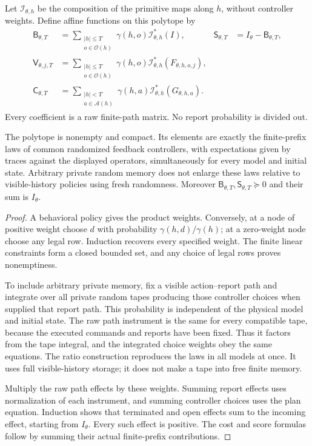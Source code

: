 Let $\mathcal I_{\theta,h}$ be the composition of the primitive maps along $h$, without controller weights. Define affine functions on this polytope by
\begin{align}
 \mathsf B_{\theta,T}&=\sum_{\substack{|h|\le T\\o\in\mathcal O(h)}}
       \gamma(h,o)\mathcal I_{\theta,h}^*(I),&
 \mathsf S_{\theta,T}&=I_\theta-\mathsf B_{\theta,T},\label{eq:syn-mass}\\
 \mathsf V_{\theta,j,T}&=\sum_{\substack{|h|\le T\\o\in\mathcal O(h)}}
       \gamma(h,o)\mathcal I_{\theta,h}^*(F_{\theta,h,o,j}),\label{eq:syn-value}\\
 \mathsf C_{\theta,T}&=\sum_{\substack{|h|<T\\a\in\mathcal A(h)}}
       \gamma(h,a)\mathcal I_{\theta,h}^*(G_{\theta,h,a}).\label{eq:syn-cost}
\end{align}
Every coefficient is a raw finite-path matrix. No report probability is divided out.

\begin{lemma}\label{lem:common-plan}
The polytope is nonempty and compact. Its elements are exactly the finite-prefix laws of common randomized feedback controllers, with expectations given by traces against the displayed operators, simultaneously for every model and initial state. Arbitrary private random memory does not enlarge these laws relative to visible-history policies using fresh randomness. Moreover $\mathsf B_{\theta,T},\mathsf S_{\theta,T}\succeq0$ and their sum is $I_\theta$.
\end{lemma}
\begin{proof}
A behavioral policy gives the product weights. Conversely, at a node of positive weight choose $d$ with probability $\gamma(h,d)/\gamma(h)$; at a zero-weight node choose any legal row. Induction recovers every specified weight. The finite linear constraints form a closed bounded set, and any choice of legal rows proves nonemptiness.

To include arbitrary private memory, fix a visible action--report path and integrate over all private random tapes producing those controller choices when supplied that report path. This probability is independent of the physical model and initial state. The raw path instrument is the same for every compatible tape, because the executed commands and reports have been fixed. Thus it factors from the tape integral, and the integrated choice weights obey the same equations. The ratio construction reproduces the laws in all models at once. It uses full visible-history storage; it does not make a tape into free finite memory.

Multiply the raw path effects by these weights. Summing report effects uses normalization of each instrument, and summing controller choices uses the plan equation. Induction shows that terminated and open effects sum to the incoming effect, starting from $I_\theta$. Every such effect is positive. The cost and score formulas follow by summing their actual finite-prefix contributions.
\end{proof}

